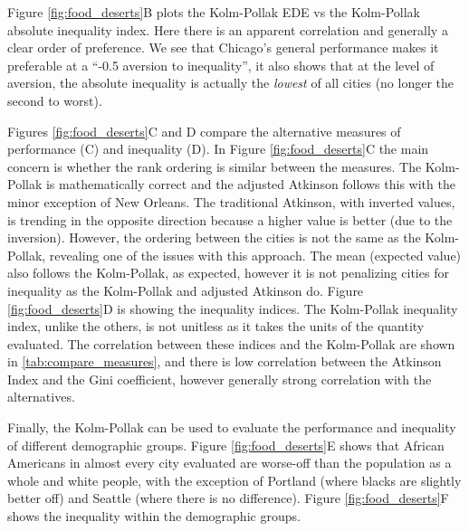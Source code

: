 \documentclass[final,3p,times,onecolumn,sort&compress]{elsarticle}
\begin{document}
Figure \ref{fig:food_deserts}B plots the Kolm-Pollak EDE vs the Kolm-Pollak absolute inequality index. 
Here there is an apparent correlation and generally a clear order of preference.
We see that Chicago's general performance makes it preferable at a ``-0.5 aversion to inequality'', it also shows that at the level of aversion, the absolute inequality is actually the \textit{lowest} of all cities (no longer the second to worst). 

Figures \ref{fig:food_deserts}C and D compare the alternative measures of performance (C) and inequality (D).
In Figure \ref{fig:food_deserts}C the main concern is whether the rank ordering is similar between the measures.
The Kolm-Pollak is mathematically correct and the adjusted Atkinson follows this with the minor exception of New Orleans.
The traditional Atkinson, with inverted values, is trending in the opposite direction because a higher value is better (due to the inversion).
However, the ordering between the cities is not the same as the Kolm-Pollak, revealing one of the issues with this approach.
The mean (expected value) also follows the Kolm-Pollak, as expected, however it is not penalizing cities for inequality as the Kolm-Pollak and adjusted Atkinson do.
Figure \ref{fig:food_deserts}D is showing the inequality indices.
The Kolm-Pollak inequality index, unlike the others, is not unitless as it takes the units of the quantity evaluated.
The correlation between these indices and the Kolm-Pollak are shown in \ref{tab:compare_measures}, and there is low correlation between the Atkinson Index and the Gini coefficient, however generally strong correlation with the alternatives.

Finally, the Kolm-Pollak can be used to evaluate the performance and inequality of different demographic groups.
Figure \ref{fig:food_deserts}E shows that African Americans in almost every city evaluated are worse-off than the population as a whole and white people, with the exception of Portland (where blacks are slightly better off) and Seattle (where there is no difference). 
Figure \ref{fig:food_deserts}F shows the inequality within the demographic groups.
\end{document}
